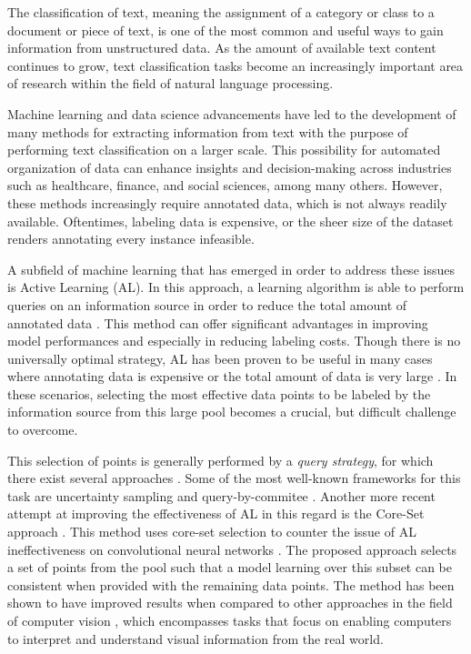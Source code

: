 \documentclass[english,bachelor,ul]{webisthesis} %
\begin{document}
The classification of text, meaning the assignment of a category or class to a document or piece of text, is one of the most common and useful ways to gain information from unstructured data. As the amount of available text content continues to grow, text classification tasks become an increasingly important area of research within the field of natural language processing. 

Machine learning and data science advancements have led to the development of many methods for extracting information from text with the purpose of performing text classification on a larger scale. This possibility for automated organization of data can enhance insights and decision-making across industries such as healthcare, finance, and social sciences, among many others. However, these methods increasingly require annotated data, which is not always readily available. Oftentimes, labeling data is expensive, or the sheer size of the dataset renders annotating every instance infeasible.

A subfield of machine learning that has emerged in order to address these issues is Active Learning (AL). In this approach, a learning algorithm is able to perform queries on an information source in order to reduce the total amount of annotated data \citep{settles.tr09}. This method can offer significant advantages in improving model performances and especially in reducing labeling costs. Though there is no universally optimal strategy, AL has been proven to be useful in many cases where annotating data is expensive or the total amount of data is very large \citep{settles.tr09}. In these scenarios, selecting the most effective data points to be labeled by the information source from this large pool becomes a crucial, but difficult challenge to overcome. 

This selection of points is generally performed by a \textit{query strategy}, for which there exist several approaches \citep{settles.tr09}. Some of the most well-known frameworks for this task are uncertainty sampling \citep{DBLP:conf/sigir/LewisG94} and query-by-commitee \citep{DBLP:conf/colt/SeungOS92}. Another more recent attempt at improving the effectiveness of AL in this regard is the Core-Set approach \citep{DBLP:conf/iclr/SenerS18}. This method uses core-set selection to counter the issue of AL ineffectiveness on convolutional neural networks \citep{DBLP:conf/iclr/SenerS18}. The proposed approach selects a set of points from the pool such that a model learning over this subset can be consistent when provided with the remaining data points. The method has been shown to have improved results when compared to other approaches in the field of computer vision \citep{DBLP:conf/iclr/SenerS18, DBLP:conf/cvpr/CaramalauBK21}, which encompasses tasks that focus on enabling computers to interpret and understand visual information from the real world. 
\end{document}
